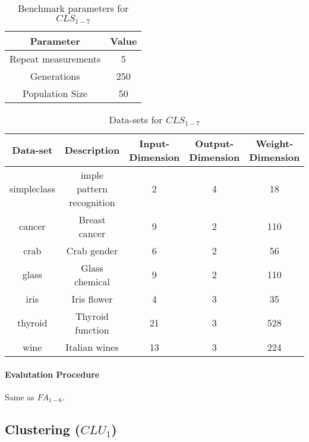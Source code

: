 \begin{table}[H]
  \centering
  \begin{center}
    \footnotesize
    \begin{tabular}{ | c | c | }
      \hline
      Parameter & Value \\ \hline
      Repeat measurements & 5 \\ \hline
      Generations & 250 \\ \hline
      Population Size & 50 \\ \hline
    \end{tabular}
  \end{center}
  \caption{Benchmark parameters for $CLS_{1-7}$}
  \label{table:cls1-7_params}
\end{table}

\begin{table}[H]
  \centering
  \begin{center}
    \footnotesize
    \begin{tabular}{ | c | c | c | c | c | }
      \hline
      Data-set & Description & Input-Dimension & Output-Dimension & Weight-Dimension \\ \hline
      simpleclass & imple pattern recognition & 2 & 4 & 18 \\ \hline
      cancer & Breast cancer & 9 & 2 & 110 \\ \hline
      crab & Crab gender & 6 & 2 & 56 \\ \hline
      glass & Glass chemical & 9 & 2 & 110 \\ \hline
      iris & Iris flower & 4 & 3 & 35 \\ \hline
      thyroid & Thyroid function  & 21 & 3 & 528 \\ \hline
      wine & Italian wines & 13 & 3 & 224 \\ \hline
    \end{tabular}
  \end{center}
  \caption{Data-sets for $CLS_{1-7}$}
  \label{table:cls1-7_data-sets}
\end{table}


\paragraph{Evalutation Procedure}

Same as $FA_{1-6}$.

\subsection{Clustering ($CLU_{1}$)}

